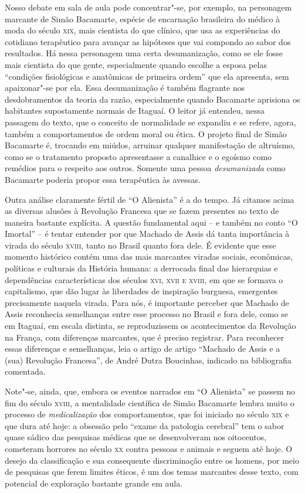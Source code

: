 \documentclass{extarticle}
\begin{document}
Nosso debate em sala de aula pode concentrar"-se, por exemplo, na
personagem marcante de Simão Bacamarte, espécie de encarnação brasileira
do médico à moda do século \textsc{xix}, mais cientista do que clínico, que usa
as experiências do cotidiano terapêutico para avançar as hipóteses que
vai compondo ao sabor dos resultados. Há nessa personagem uma certa
desumanização, como se ele fosse mais cientista do que gente,
especialmente quando escolhe a esposa pelas ``condições fisiológicas e
anatômicas de primeira ordem'' que ela apresenta, sem apaixonar"-se por
ela. Essa desumanização é também flagrante nos desdobramentos da teoria
da razão, especialmente quando Bacamarte aprisiona os habitantes
supostamente normais de Itaguaí. O leitor já entendeu, nessa passagem do
texto, que o conceito de normalidade se expandiu e se refere, agora,
também a comportamentos de ordem moral ou ética. O projeto final de
Simão Bacamarte é, trocando em miúdos, arruinar qualquer manifestação de
altruísmo, como se o tratamento proposto apresentasse a canalhice e o
egoísmo como remédios para o respeito aos outros. Somente uma pessoa
\emph{desumanizada} como Bacamarte poderia propor essa terapêutica às
avessas.

Outra análise claramente fértil de ``O Alienista'' é a do tempo. Já
citamos acima as diversas alusões à Revolução Francesa que se fazem
presentes no texto de maneira bastante explícita. A questão fundamental
aqui -- e também no conto ``O Imortal'' -- é tentar entender por que
Machado de Assis dá tanta importância à virada do século \textsc{xviii}, tanto no
Brasil quanto fora dele. É evidente que esse momento histórico contém
uma das mais marcantes viradas sociais, econômicas, políticas e
culturais da História humana: a derrocada final das hierarquias e
dependências características dos séculos \textsc{xvi, xvii e xviii}, em que se
formava o capitalismo, que dão lugar às liberdades de inspiração
burguesa, emergentes precisamente naquela virada. Para nós, é importante
perceber que Machado de Assis reconhecia semelhanças entre esse processo
no Brasil e fora dele, como se em Itaguaí, em escala distinta, se
reproduzissem os acontecimentos da Revolução na França, com diferenças
marcantes, que é preciso registrar. Para reconhecer essas diferenças e
semelhanças, leia o artigo de artigo ``Machado de Assis e a (sua)
Revolução Francesa'', de André Dutra Boucinhas, indicado na bibliografia
comentada.

Note"-se, ainda, que, embora os eventos narrados em ``O Alienista'' se
passem no fim do século \textsc{xviii}, a mentalidade científica de Simão
Bacamarte lembra muito o processo de \emph{medicalização} dos
comportamentos, que foi iniciado no século \textsc{xix} e que dura até hoje: a
obsessão pelo ``exame da patologia cerebral'' tem o sabor quase sádico
das pesquisas médicas que se desenvolveram nos oitocentos, cometeram
horrores no século \textsc{xx} contra pessoas e animais e seguem até hoje. O
desejo da classificação e sua consequente discriminação entre os homens,
por meio de pesquisas que ferem limites éticos, é um dos temas marcantes
desse texto, com potencial de exploração bastante grande em aula.
\end{document}
